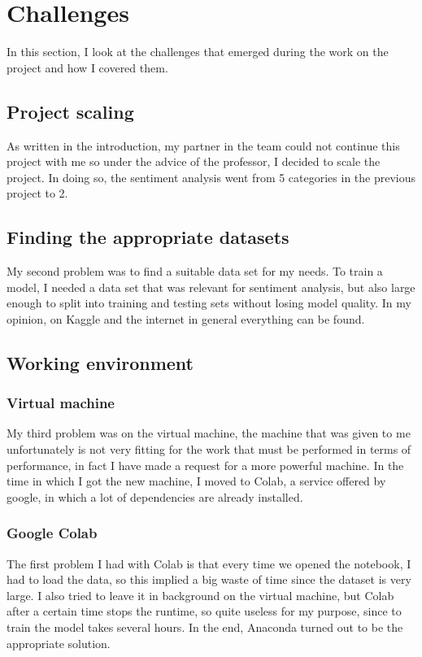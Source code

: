 \section{Challenges}
In this section, I look at the challenges that emerged during the work on the project and how I covered them.
\subsection{Project scaling}
As written in the introduction, my partner in the team could not continue this project with me so under the advice of the professor, I decided to scale the project.
In doing so, the sentiment analysis went from 5 categories in the previous project to 2.

\subsection{Finding the appropriate datasets} 
My second problem was to find a suitable data set for my needs. To train a model, I needed a data set that was relevant for sentiment analysis, but also large enough to split into training and testing sets without losing model quality. In my opinion, on Kaggle and the internet in general everything can be found.
\subsection{Working environment}
\subsubsection{Virtual machine}
My third problem was on the virtual machine, the machine that was given to me unfortunately is not very fitting for the work that must be performed in terms of performance, in fact I have made a request for a more powerful machine. In the time in which I got the new machine, I moved to Colab, a service offered by google, in which a lot of dependencies are already installed.

\subsubsection{Google Colab}
The first problem I had with Colab is that every time we opened the notebook, I had to load the data, so this implied a big waste of time since the dataset is very large. I also tried to leave it in background on the virtual machine, but Colab after a certain time stops the runtime, so quite useless for my purpose, since to train the model takes several hours.
In the end, Anaconda turned out to be the appropriate solution.

